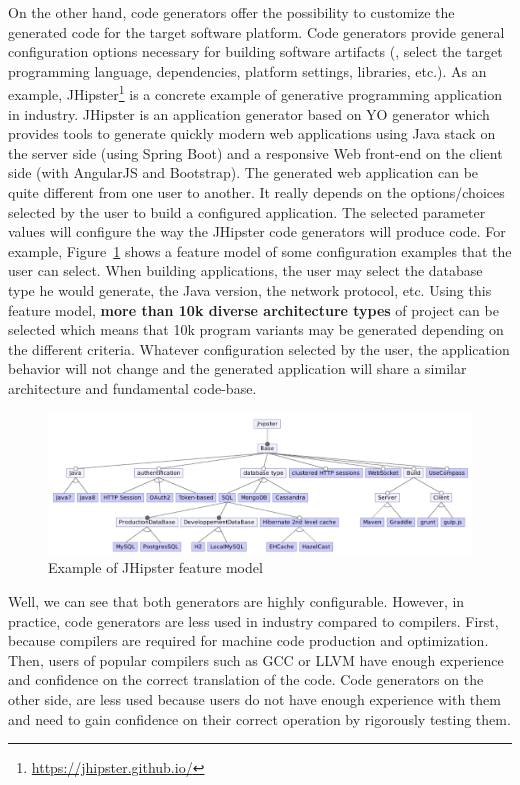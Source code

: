 On the other hand, code generators offer the possibility to customize the generated code for the target software platform. Code generators provide general configuration options necessary for building software artifacts (\eg, select the target programming language, dependencies, platform settings, libraries, etc.).
As an example, JHipster\footnote{\url{https://jhipster.github.io/}} is a concrete example of generative programming application in industry. JHipster is an application generator based on YO generator which provides tools to generate quickly modern web applications using Java stack on the server side (using Spring Boot) and a responsive Web front-end on the client side (with AngularJS and Bootstrap).
The generated web application can be quite different from one user to another. It really depends on the options/choices selected by the user to build a configured application. The selected parameter values will configure the way the JHipster code generators will produce code. 
For example, Figure~\ref{fig:jhipster} shows a feature model of some configuration examples that the user can select. When building applications, the user may select the database type he would generate, the Java version, the network protocol, etc. 
Using this feature model, \textbf{more than 10k diverse architecture types} of project can be selected which means that 10k program variants may be generated depending on the different criteria.
Whatever configuration selected by the user, the application behavior will not change and the generated application will share a similar architecture and fundamental code-base.
\begin{figure}[h]
	\center
	\includegraphics[scale=0.65]{Background/fig/jhipster}
	\caption{Example of JHipster feature model}
	\label{fig:jhipster}
\end{figure}

Well, we can see that both generators are highly configurable. However, in practice, code generators are less used in industry compared to compilers. First, because compilers are required for machine code production and optimization. Then, users of popular compilers such as GCC or LLVM have enough experience and confidence on the correct translation of the code. 
Code generators on the other side, are less used because users do not have enough experience with them and need to gain confidence on their correct operation by rigorously testing them. 

